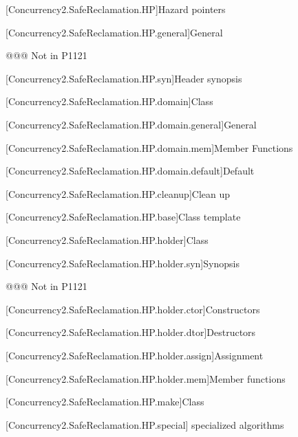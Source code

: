 
[Concurrency2.SafeReclamation.HP]{Hazard pointers}

[Concurrency2.SafeReclamation.HP.general]{General}

@@@ Not in P1121

[Concurrency2.SafeReclamation.HP.syn]{Header  synopsis}

[Concurrency2.SafeReclamation.HP.domain]{Class }

[Concurrency2.SafeReclamation.HP.domain.general]{General}

[Concurrency2.SafeReclamation.HP.domain.mem]{Member Functions}

[Concurrency2.SafeReclamation.HP.domain.default]{Default }

[Concurrency2.SafeReclamation.HP.cleanup]{Clean up}

[Concurrency2.SafeReclamation.HP.base]{Class template }

[Concurrency2.SafeReclamation.HP.holder]{Class }

[Concurrency2.SafeReclamation.HP.holder.syn]{Synopsis}

@@@ Not in P1121

[Concurrency2.SafeReclamation.HP.holder.ctor]{Constructors}

[Concurrency2.SafeReclamation.HP.holder.dtor]{Destructors}

[Concurrency2.SafeReclamation.HP.holder.assign]{Assignment}

[Concurrency2.SafeReclamation.HP.holder.mem]{Member functions}

[Concurrency2.SafeReclamation.HP.make]{Class }

[Concurrency2.SafeReclamation.HP.special]{ specialized algorithms}
